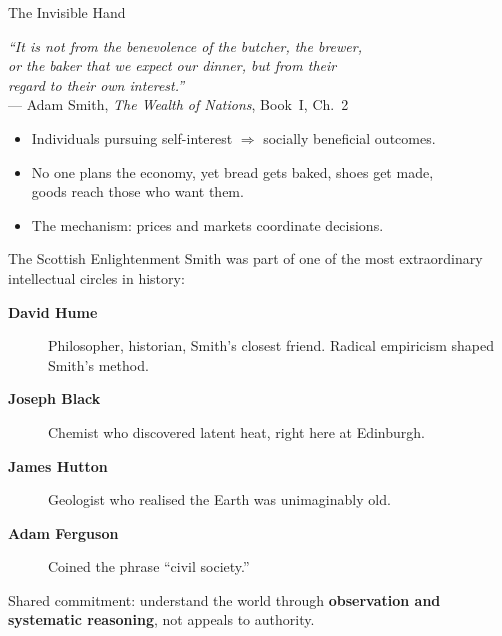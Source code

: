 \documentclass[aspectratio=169, 10pt]{beamer}
\begin{document}
\begin{frame}{The Invisible Hand}
\begin{center}
\textit{``It is not from the benevolence of the butcher, the brewer,\\
or the baker that we expect our dinner, but from their\\
regard to their own interest.''}\\[4pt]
--- Adam Smith, \textit{The Wealth of Nations}, Book~I, Ch.~2
\end{center}
\vspace{1em}
\begin{itemize}
  \item Individuals pursuing self-interest $\Rightarrow$ socially beneficial outcomes.
  \item No one plans the economy, yet bread gets baked, shoes get made,\\
        goods reach those who want them.
  \item The mechanism: \alert{prices and markets} coordinate decisions.
\end{itemize}
\end{frame}

\begin{frame}{The Scottish Enlightenment}
Smith was part of one of the most extraordinary intellectual circles in history:
\vspace{0.5em}
\begin{description}
  \item[\textbf{David Hume}] Philosopher, historian, Smith's closest friend.
        Radical empiricism shaped Smith's method.
  \item[\textbf{Joseph Black}] Chemist who discovered latent heat,
        right here at Edinburgh.
  \item[\textbf{James Hutton}] Geologist who realised the Earth was
        unimaginably old.
  \item[\textbf{Adam Ferguson}] Coined the phrase ``civil society.''
\end{description}
\vspace{0.5em}
Shared commitment: understand the world through \textbf{observation and
systematic reasoning}, not appeals to authority.
\end{frame}
\end{document}
